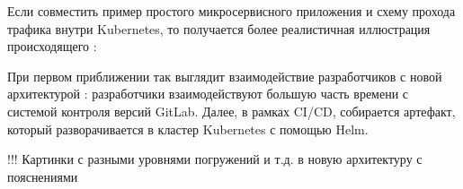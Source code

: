 Если совместить пример простого микросервисного приложения  и схему прохода трафика внутри Kubernetes, то получается более реалистичная иллюстрация происходящего :

При первом приближении так выглядит взаимодействие разработчиков с новой архитектурой : разработчики взаимодействуют большую часть времени с системой контроля версий GitLab. Далее, в рамках CI/CD, собирается артефакт, который разворачивается в кластер Kubernetes с помощью Helm.

!!! Картинки с разными уровнями погружений и т.д. в новую архитектуру с пояснениями
